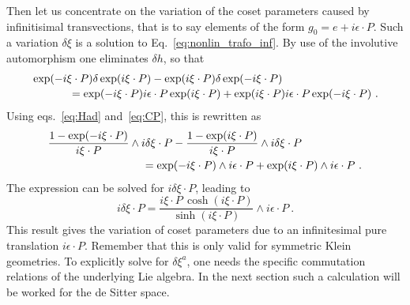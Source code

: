 \documentclass[11pt]{article}
\begin{document}
\blankline\noindent
Then let us concentrate on the variation of the coset parameters 
caused by infinitisimal transvections, that is to say elements of 
the form $g_0 = e + i\epsilon\cdot P$. Such a variation 
$\delta\xi$ is a solution to Eq.~\eqref{eq:nonlin_trafo_inf}. By 
use of the involutive automorphism one eliminates $\delta h$, so 
that
\begin{displaymath}
\begin{multlined}[b][\linewidth-\multlinegap]
	\quad
	\exp(-i\xi\cdot P)\delta\exp(i\xi\cdot P) - \exp(i\xi\cdot 
	P)\delta\exp(-i\xi\cdot P) \\
	= \exp(-i\xi\cdot P) i\epsilon\cdot P \exp(i\xi\cdot P) + 
	\exp(i\xi\cdot P) i\epsilon\cdot P \exp(-i\xi\cdot P)~.
	\quad
\end{multlined}
\end{displaymath}
Using eqs.~\eqref{eq:Had} and~\eqref{eq:CP}, this is rewritten as 
\begin{displaymath}
\begin{multlined}[b][\linewidth-2\multlinegap]
	\quad\quad
	\frac{1-\exp(-i\xi\cdot P)}{i\xi\cdot P} \wedge 
	i\delta\xi\cdot P - \frac{1-\exp(i\xi\cdot P)}{i\xi\cdot P} 
	\wedge i\delta\xi\cdot P \\
	= \exp(-i\xi\cdot P) \wedge i\epsilon\cdot P + \exp(i\xi\cdot 
	P) \wedge i\epsilon\cdot P~.
	\quad\quad
\end{multlined}
\end{displaymath}
The expression can be solved for $i\delta\xi\cdot P$, leading to
%
\begin{equation}\label{eq:inftrafo_cosetpar}
	i\delta\xi \cdot P = \frac{i\xi\cdot P\,\cosh(i\xi\cdot 
		P)}{\sinh(i\xi\cdot P)} \wedge i\epsilon\cdot P~.
\end{equation}
This result gives the variation of coset parameters due to an 
infinitesimal pure translation $i\epsilon\cdot P$. Remember that 
this is only valid for symmetric Klein geometries. To explicitly 
solve for $\delta \xi ^a$, one needs the specific commutation 
relations of the underlying Lie algebra. In the next section such 
a calculation will be worked for the de Sitter space.
\end{document}
